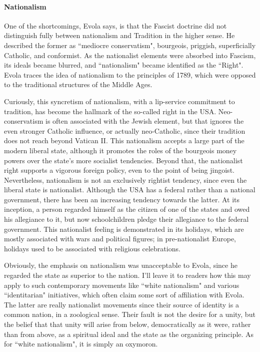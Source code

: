 \paragraph{Nationalism}
One of the shortcomings, Evola says, is that the Fascist doctrine did not distinguish fully between nationalism and Tradition in the higher sense. He described the former as ``mediocre conservatism", bourgeois, priggish, superficially Catholic, and conformist. As the nationalist elements were absorbed into Fascism, its ideals became blurred, and ``nationalism" became identified as the ``Right". Evola traces the idea of nationalism to the principles of 1789, which were opposed to the traditional structures of the Middle Ages.

Curiously, this syncretism of nationalism, with a lip-service commitment to tradition, has become the hallmark of the so-called right in the USA. Neo-conservatism is often associated with the Jewish element, but that ignores the even stronger Catholic influence, or actually neo-Catholic, since their tradition does not reach beyond Vatican II. This nationalism accepts a large part of the modern liberal state, although it promotes the roles of the bourgeois money powers over the state's more socialist tendencies. Beyond that, the nationalist right supports a vigorous foreign policy, even to the point of being jingoist. Nevertheless, nationalism is not an exclusively rightist tendency, since even the liberal state is nationalist. Although the USA has a federal rather than a national government, there has been an increasing tendency towards the latter. At its inception, a person regarded himself as the citizen of one of the states and owed his allegiance to it, but now schoolchildren pledge their allegiance to the federal government. This nationalist feeling is demonstrated in its holidays, which are mostly associated with wars and political figures; in pre-nationalist Europe, holidays used to be associated with religious celebrations.

Obviously, the emphasis on nationalism was unacceptable to Evola, since he regarded the state as superior to the nation. I'll leave it to readers how this may apply to such contemporary movements like ``white nationalism" and various ``identitarian" initiatives, which often claim some sort of affiliation with Evola. The latter are really nationalist movements since their source of identity is a common nation, in a zoological sense. Their fault is not the desire for a unity, but the belief that that unity will arise from below, democratically as it were, rather than from above, as a spiritual ideal and the state as the organizing principle. As for ``white nationalism", it is simply an oxymoron.

